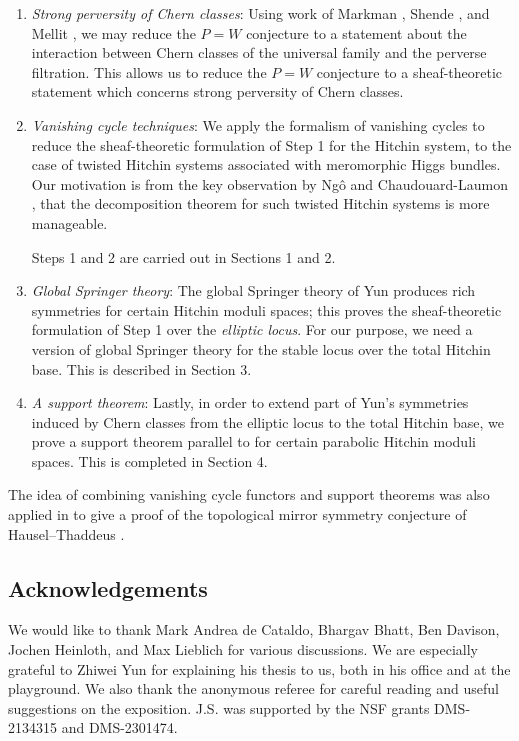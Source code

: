 \begin{enumerate}
    \item[Step 1.] \emph{Strong perversity of Chern classes}: Using work of Markman \cite{Markman}, Shende \cite{Shende}, and Mellit \cite{Mellit}, we may reduce the $P=W$ conjecture to a statement about the interaction between Chern classes of the universal family and the perverse filtration. This allows us to reduce the $P=W$ conjecture to a sheaf-theoretic statement which concerns strong perversity of Chern classes.
    \item[Step 2.] \emph{Vanishing cycle techniques}: We apply the formalism of vanishing cycles to reduce the sheaf-theoretic formulation of Step 1 for the Hitchin system, to the case of twisted Hitchin systems associated with meromorphic Higgs bundles. Our motivation is from the key observation by Ng\^o \cite{Ngo} and Chaudouard-Laumon \cite{CL}, that the decomposition theorem for such twisted Hitchin systems is more manageable.

    Steps 1 and 2 are carried out in Sections 1 and 2.

    \item[Step 3.]\emph{Global Springer theory}: The global Springer theory of Yun \cite{Yun1,Yun2,Yun3} produces rich symmetries for certain Hitchin moduli spaces; this proves the sheaf-theoretic formulation of Step 1 over the \emph{elliptic locus}. For our purpose, we need a version of global Springer theory for the stable locus over the total Hitchin base. This is described in Section 3.

    \item[Step 4.] \emph{A support theorem}: Lastly, in order to extend part of Yun's symmetries induced by Chern classes from the elliptic locus to the total Hitchin base, we prove a support theorem parallel to \cite{CL} for certain parabolic Hitchin moduli spaces. This is completed in Section 4.
\end{enumerate}

The idea of combining vanishing cycle functors and support theorems was also applied in \cite{MS} to give a proof of the topological mirror symmetry conjecture of Hausel--Thaddeus \cite{HT,GWZ}.

\subsection{Acknowledgements}
We would like to thank Mark Andrea de Cataldo, Bhargav Bhatt, Ben Davison, Jochen Heinloth, and Max Lieblich for various discussions.  We are especially grateful to Zhiwei Yun for explaining his thesis to us, both in his office and at the playground.  We also thank the anonymous referee for careful
reading and useful suggestions on the exposition. J.S. was supported by the NSF grants DMS-2134315 and DMS-2301474.

